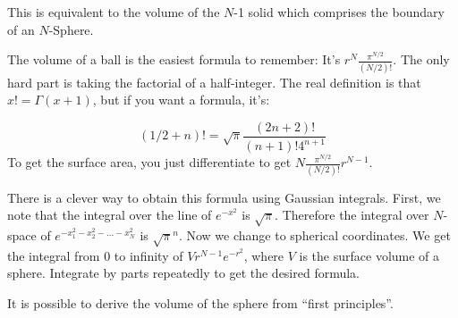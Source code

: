 
This is equivalent to the volume of the $N$-1
    solid which comprises the boundary of an $N$-Sphere.

The volume of a ball is the easiest formula to remember:  It's 
$r^N \frac{\pi^{N/2}}{(N/2)!}$.
     The only hard part is taking the factorial
    of a half-integer.  The real definition is that $x! = \Gamma(x+1)$, but
    if you want a formula, it's:

    \[(1/2+n)! = \sqrt{\pi} \frac{(2n+2)!}{(n+1)!4^{n+1}}\]
    To get the surface area, you just differentiate to get
    $N\frac{\pi^{N/2}}{(N/2)!}r^{N-1}$.

    There is a clever way to obtain this formula using Gaussian
    integrals. First, we note that the integral over the line of
    $e^{-x^2}$ is $\sqrt{\pi}$.  Therefore the integral over $N$-space of
    $e^{-x_1^2-x_2^2-...-x_N^2}$ is $\sqrt{\pi}^n$.  Now we change to
    spherical coordinates.  We get the integral from 0 to infinity
    of $Vr^{N-1}e^{-r^2}$, where $V$ is the surface volume of a sphere.
    Integrate by parts repeatedly to get the desired formula.

    It is possible to derive the volume of the sphere from ``first 
    principles''.



